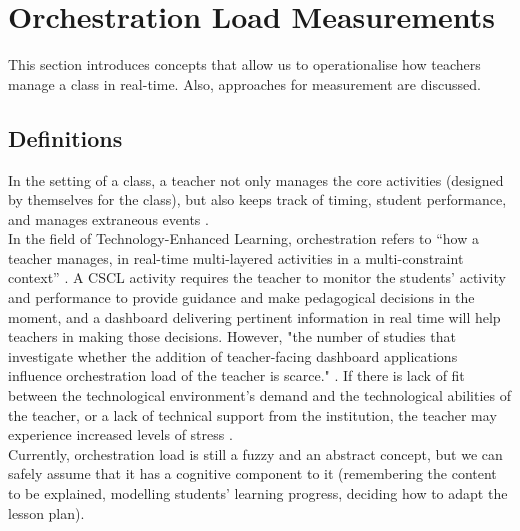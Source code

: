 \section{Orchestration Load Measurements}
This section introduces concepts that allow us to operationalise how teachers manage a class in real-time. Also, approaches for measurement are discussed.
\subsection{Definitions}
In the setting of a class, a teacher not only manages the core activities (designed by themselves for the class), but also keeps track of timing, student performance, and manages extraneous events \cite{Dillenbourg2013-kx}. \\
In the field of Technology-Enhanced Learning, orchestration refers to “how a teacher manages, in real-time multi-layered activities in a multi-constraint context” \cite{Dillenbourg2013-kx}. A CSCL activity requires the teacher to monitor the students' activity and performance to provide guidance and make pedagogical decisions in the moment, and a dashboard delivering pertinent information in real time will help teachers in making those decisions. However, "the number of studies that investigate whether the addition of teacher-facing dashboard applications influence orchestration load of the teacher is scarce." \cite{Amarasinghe2020-wt}. If there is lack of fit between the technological environment's demand and the technological abilities of the teacher, or a lack of technical support from the institution, the teacher may experience increased levels of stress \cite{Al-Fudail2008-zo}.\\
Currently, orchestration load is still a fuzzy and an abstract concept, \cite{Prieto2015-gd} but we can safely assume that it has a cognitive component to it (remembering the content to be explained, modelling students’ learning progress, deciding how to adapt the lesson plan).
